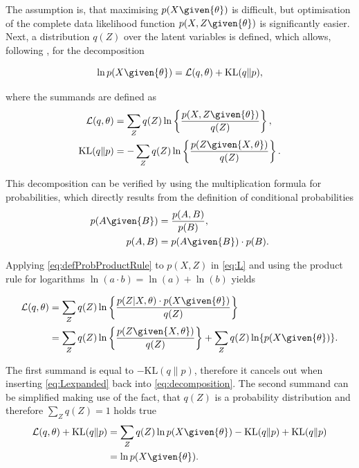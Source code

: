 The assumption is, that maximising $p(X\given{\theta})$ is difficult, but optimisation of the complete data likelihood function $p(X,Z\given{\theta})$ is significantly easier. Next, a distribution $q(Z)$ over the latent variables is defined, which allows, following \cite[p.~450]{Bishop2006}, for the decomposition

\begin{equation}\label{eq:decomposition}
    \ln p(X\given{\theta})=\mathcal{L}(q,\theta)+\text{KL}(q\|p),
\end{equation}

where the summands are defined as
\begin{align}
    \mathcal{L}(q,\theta)&=\sum_Z q(Z)\ln\left\{\frac{p(X,Z\given{\theta})}{q(Z)}\right\}\label{eq:L},\\
    \text{KL}(q\|p)&=-\sum_{Z}q(Z)\ln\left\{\frac{p(Z\given{X,\theta})}{q(Z)} \right\}\label{eq:KL}.
\end{align}

This decomposition can be verified by using the multiplication formula for probabilities, which directly results from the definition of conditional probabilities
\begin{align}
\label{eq:defProbCond}
    p(A\given{B})&=\frac{p(A,B)}{p(B)},\\
\label{eq:defProbProductRule}
    p(A,B)&=p(A\given{B})\cdot p(B).
\end{align}

Applying \eqref{eq:defProbProductRule} to $p(X,Z)$ in \eqref{eq:L} and using the product rule for logarithms $\ln(a\cdot b)=\ln(a)+\ln(b)$ yields

\begin{align}
    \mathcal{L}(q,\theta)&=\sum_{Z}q(Z)\ln\left\{\frac{p(Z\vert X,\theta)\cdot p(X\given{\theta})}{q(Z)}\right\}\\
\label{eq:Lexpanded}
    &=\sum_{Z}q(Z)\ln\left\{\frac{p(Z\given{X,\theta})}{q(Z)} \right\}+\sum_{Z}q(Z)\ln\{p(X\given{\theta})\}.
\end{align}

The first summand is equal to $-\text{KL}(q\|p)$, therefore it cancels out when inserting \eqref{eq:Lexpanded} back into \eqref{eq:decomposition}. The second summand can be simplified making use of the fact, that $q(Z)$ is a probability distribution and therefore $\sum_{Z}q(Z)=1$ holds true
\begin{align}
    \mathcal{L}(q,\theta)+\text{KL}(q\|p)&=\sum_{Z}q(Z)\ln p(X\given{\theta})-\text{KL}(q\|p)+\text{KL}(q\|p)\\
    &=\ln p(X\given{\theta}).
\end{align}

